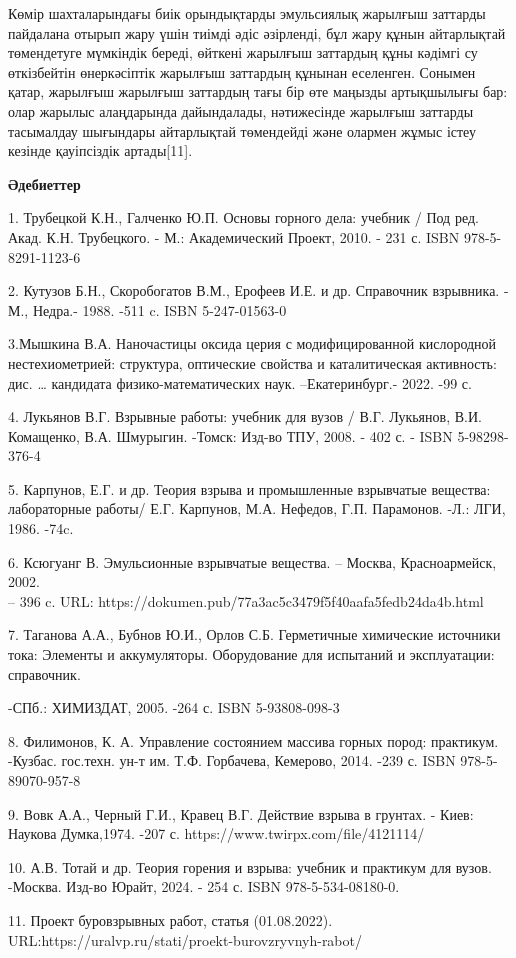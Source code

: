 \begin{multicols}{2}
Көмір шахталарындағы биік орындықтарды эмульсиялық жарылғыш заттарды
пайдалана отырып жару үшін тиімді әдіс әзірленді, бұл жару құнын
айтарлықтай төмендетуге мүмкіндік береді, өйткені жарылғыш заттардың
құны кәдімгі су өткізбейтін өнеркәсіптік жарылғыш заттардың құнынан
еселенген. Сонымен қатар, жарылғыш жарылғыш заттардың тағы бір өте
маңызды артықшылығы бар: олар жарылыс алаңдарында дайындалады,
нәтижесінде жарылғыш заттарды тасымалдау шығындары айтарлықтай
төмендейді және олармен жұмыс істеу кезінде қауіпсіздік артады{[}11{]}.
\end{multicols}

\begin{center}
{\bfseries Әдебиеттер}
\end{center}

\begin{noparindent}
1. Трубецкой К.Н., Галченко Ю.П. Основы горного дела: учебник / Под ред.
Акад. К.Н. Трубецкого. - М.: Академический Проект, 2010. - 231 с. ISBN
978-5-8291-1123-6

2. Кутузов Б.Н., Скоробогатов В.М., Ерофеев И.Е. и др. Справочник
взрывника. - М., Недра.- 1988. -511 c. ISBN 5-247-01563-0

3.Мышкина В.А. Наночастицы оксида церия с модифицированной кислородной
нестехиометрией: структура, оптические свойства и каталитическая
активность: дис. \ldots{} кандидата физико-математических наук.
--Екатеринбург.- 2022. -99 с.

4. Лукьянов В.Г. Взрывные работы: учебник для вузов / В.Г. Лукьянов,
В.И. Комащенко, В.А. Шмурыгин. -Томск: Изд-во ТПУ, 2008. - 402 с. - ISBN
5-98298-376-4

5. Карпунов, Е.Г. и др. Теория взрыва и промышленные взрывчатые
вещества: лабораторные работы/ Е.Г. Карпунов, М.А. Нефедов, Г.П.
Парамонов. -Л.: ЛГИ, 1986. -74c.

6. Ксюгуанг В. Эмульсионные взрывчатые вещества. -- Москва,
Красноармейск, 2002.\\
-- 396 c. URL: https://dokumen.pub/77a3ac5c3479f5f40aafa5fedb24da4b.html

7. Таганова А.А., Бубнов Ю.И., Орлов С.Б. Герметичные химические
источники тока: Элементы и аккумуляторы. Оборудование для испытаний и
эксплуатации: справочник.

-СПб.: ХИМИЗДАТ, 2005. -264 с. ISBN 5-93808-098-3

8. Филимонов, К. А. Управление состоянием массива горных пород:
практикум. -Кузбас. гос.техн. ун-т им. Т.Ф. Горбачева, Кемерово, 2014.
-239 с. ISBN 978-5-89070-957-8

9. Вовк А.А., Черный Г.И., Кравец В.Г. Действие взрыва в грунтах. -
Киев: Наукова Думка,1974. -207 с. https://www.twirpx.com/file/4121114/

10. А.В. Тотай и др. Теория горения и взрыва: учебник и практикум для
вузов. -Москва. Изд-во Юрайт, 2024. - 254 с. ISBN 978-5-534-08180-0.

11. Проект буровзрывных работ, статья (01.08.2022).
URL:https://uralvp.ru/stati/proekt-burovzryvnyh-rabot/
\end{noparindent}

